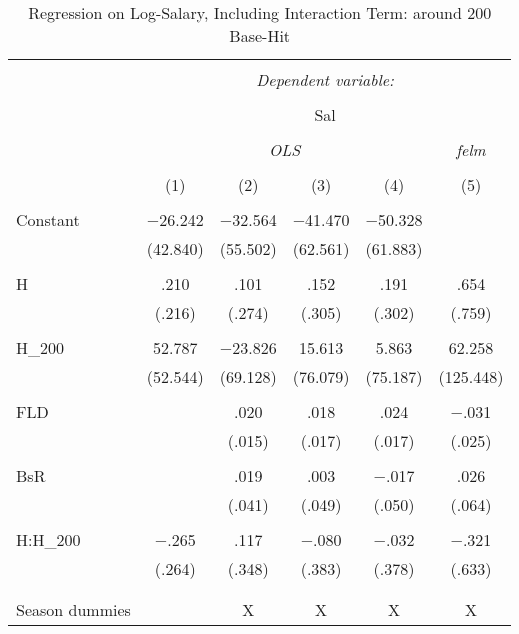 
\begin{table}[H] \centering
  \caption{Regression on Log-Salary, Including Interaction Term:
          around 200 Base-Hit}
  \label{H200_A}
\tiny
\begin{tabular}{@{\extracolsep{5pt}}lccccc}
\\[-1.8ex]\hline
\hline \\[-1.8ex]
 & \multicolumn{5}{c}{\textit{Dependent variable:}} \\
\cline{2-6}
\\[-1.8ex] & \multicolumn{5}{c}{Sal} \\
\\[-1.8ex] & \multicolumn{4}{c}{\textit{OLS}} & \textit{felm} \\
\\[-1.8ex] & (1) & (2) & (3) & (4) & (5)\\
\hline \\[-1.8ex]
 Constant & $-$26.242 & $-$32.564 & $-$41.470 & $-$50.328 &  \\
  & (42.840) & (55.502) & (62.561) & (61.883) &  \\
  & & & & & \\
 H & .210 & .101 & .152 & .191 & .654 \\
  & (.216) & (.274) & (.305) & (.302) & (.759) \\
  & & & & & \\
 H\_200 & 52.787 & $-$23.826 & 15.613 & 5.863 & 62.258 \\
  & (52.544) & (69.128) & (76.079) & (75.187) & (125.448) \\
  & & & & & \\
 FLD &  & .020 & .018 & .024 & $-$.031 \\
  &  & (.015) & (.017) & (.017) & (.025) \\
  & & & & & \\
 BsR &  & .019 & .003 & $-$.017 & .026 \\
  &  & (.041) & (.049) & (.050) & (.064) \\
  & & & & & \\
 H:H\_200 & $-$.265 & .117 & $-$.080 & $-$.032 & $-$.321 \\
  & (.264) & (.348) & (.383) & (.378) & (.633) \\
  & & & & & \\
\hline \\[-1.8ex]
Season dummies &  & X & X & X & X \\

\end{tabular}
\end{table}
